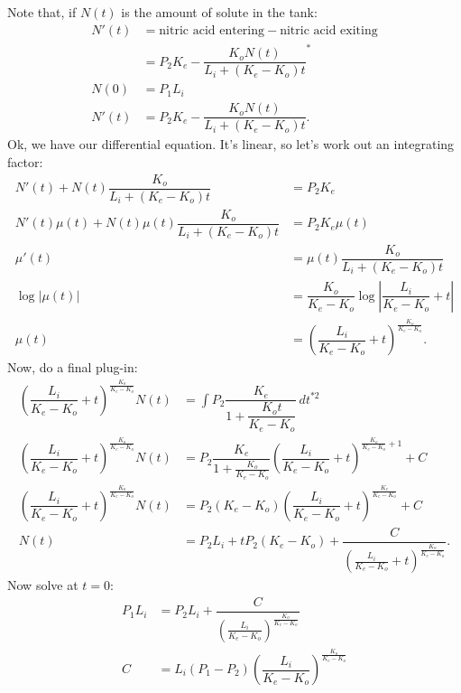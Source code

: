 \documentclass[11pt]{article}
\begin{document}
    \begin{solution*}
        Note that, if $N(t)$ is the amount of solute in the tank:
        \begin{align}
            N'(t) &= \text{nitric acid entering} - \text{nitric acid exiting} \\ 
            &= P_2K_e - \dfrac{K_oN(t)}{L_i + (K_e-K_o)t}^{*} \\ 
            N(0) &= P_1 L_i \\ 
            N'(t) &= P_2K_e - \dfrac{K_oN(t)}{L_i + (K_e-K_o)t}.
        \end{align}
        Ok, we have our differential equation. It's linear, so let's work out an integrating factor:
        \begin{align}
            N'(t) + N(t)\dfrac{K_o}{L_i + (K_e-K_o)t} &= P_2K_e\\ 
            N'(t)\mu(t) + N(t)\mu(t)\dfrac{K_o}{L_i + (K_e-K_o)t} &= P_2K_e\mu(t)\\ 
            \mu'(t) &= \mu(t)\dfrac{K_o}{L_i + (K_e-K_o)t} \\
            \log |\mu(t) | &= \dfrac{K_o}{K_e -K_o}\log \left|\dfrac{L_i}{K_e - K_o} + t\right| \\ 
            \mu(t) &= \left(\dfrac{L_i}{K_e - K_o} + t\right)^{\frac{K_o}{K_e-K_o}}. 
        \end{align}
        Now, do a final plug-in:
        \begin{align}
            \left(\dfrac{L_i}{K_e - K_o} + t\right)^{\frac{K_o}{K_e-K_o}}N(t) &= \int P_2 \dfrac{K_e}{1 + \dfrac{K_ot}{K_e - K_o}} \, dt^{*2}\\ 
            \left(\dfrac{L_i}{K_e - K_o} + t\right)^{\frac{K_o}{K_e-K_o}}N(t) &= P_2 \dfrac{K_e}{1 + \frac{K_o}{K_e - K_o}} \left(\dfrac{L_i}{K_e - K_o} + t\right)^{\frac{K_o}{K_e-K_o} + 1} + C\\
            \left(\dfrac{L_i}{K_e - K_o} + t\right)^{\frac{K_o}{K_e-K_o}}N(t) &= P_2 (K_e - K_o)\left(\dfrac{L_i}{K_e - K_o} + t\right)^{\frac{K_e}{K_e-K_o}} + C \\
            N(t) &= P_2L_i + tP_2 (K_e - K_o) + \dfrac{C}{ \left(\frac{L_i}{K_e - K_o} + t\right)^{\frac{K_o}{K_e-K_o}}}.
        \end{align}
        Now solve at $t = 0$:
        \begin{align}
            P_1L_i &= P_2L_i + \dfrac{C}{ \left(\frac{L_i}{K_e - K_o}\right)^{\frac{K_o}{K_e-K_o}}} \\
            C &= L_i(P_1 - P_2)\left(\dfrac{L_i}{K_e - K_o}\right)^{\frac{K_o}{K_e-K_o}}  \\ 

\end{align}
\end{solution*}
\end{document}
